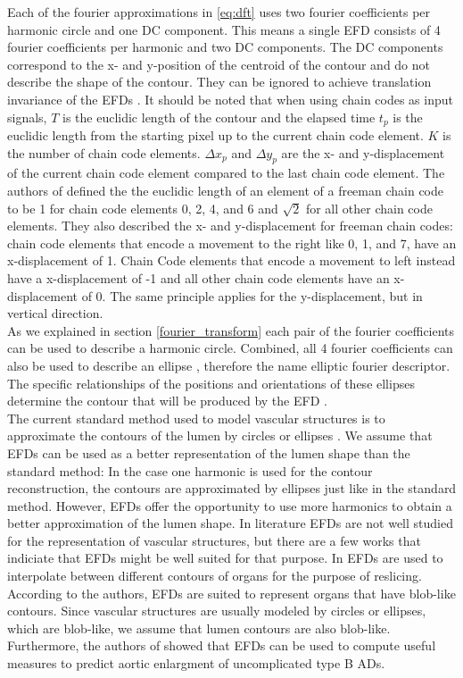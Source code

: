 \documentclass[thesis.tex]{subfiles}
\begin{document}
Each of the fourier approximations in \ref{eq:dft} uses two fourier coefficients per harmonic circle and one DC component. This means a single EFD consists of 4 fourier coefficients per harmonic and two DC components. The DC components correspond to the x- and y-position of the centroid of the contour and do not describe the shape of the contour. They can be ignored to achieve translation invariance of the EFDs \cite{giardinia}. It should be noted that when using chain codes as input signals, $T$ is the euclidic length of the contour and the elapsed time $t_p$ is the euclidic length from the starting pixel up to the current chain code element. $K$ is the number of chain code elements. $\Delta x_p$ and $\Delta y_p$ are the x- and y-displacement of the current chain code element compared to the last chain code element. The authors of \cite{giardinia} defined the the euclidic length of an element of a freeman chain code to be 1 for chain code elements 0, 2, 4, and 6 and $\sqrt{2}$ for all other chain code elements. They also described the x- and y-displacement for freeman chain codes: chain code elements that encode a movement to the right like 0, 1, and 7, have an x-displacement of 1. Chain Code elements that encode a movement to left instead have a x-displacement of -1 and all other chain code elements have an x-displacement of 0. The same principle applies for the y-displacement, but in vertical direction. \\ As we explained in section \ref{fourier_transform} each pair of the fourier coefficients can be used to describe a harmonic circle. Combined, all 4 fourier coefficients can also be used to describe an ellipse \cite{lin1987new,giardinia}, therefore the name elliptic fourier descriptor. The specific relationships of the positions and orientations of these ellipses determine the contour that will be produced by the EFD \cite{lin1987new}. \\
The current standard method used to model vascular structures is to approximate the contours of the lumen by circles or ellipses \cite{wu2011segmentation}. We assume that EFDs can be used as a better representation of the lumen shape than the standard method: In the case one harmonic is used for the contour reconstruction, the contours are approximated by ellipses just like in the standard method. However, EFDs offer the opportunity to use more harmonics to obtain a better approximation of the lumen shape. In literature EFDs are not well studied for the representation of vascular structures, but there are a few works that indiciate that EFDs might be well suited for that purpose. In \cite{jeong2007reslicing} EFDs are used to interpolate between different contours of organs for the purpose of reslicing. According to the authors, EFDs are suited to represent organs that have blob-like contours. Since vascular structures are usually modeled by circles or ellipses, which are blob-like, we assume that lumen contours are also blob-like. Furthermore, the authors of \cite{sato2017new} showed that EFDs can be used to compute useful measures to predict aortic enlargment of uncomplicated type B ADs. \\      
\end{document}
